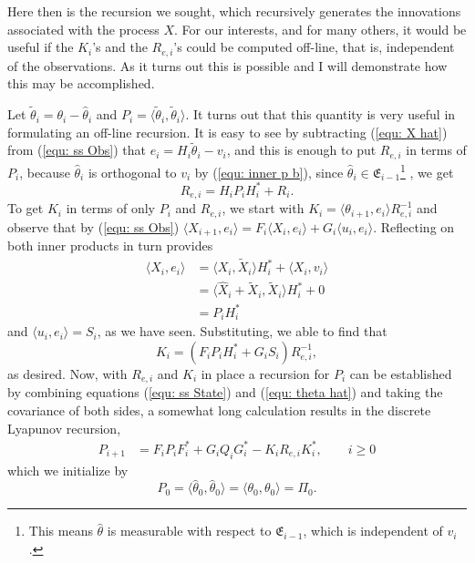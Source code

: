 \documentclass[12pt]{amsart}
\begin{document}
Here then is the recursion we sought, which recursively generates the innovations associated with the process $X$. For our interests, and for many others, it would be useful if the $K_i$'s and the $R_{e,i}$'s could be computed off-line, that is, independent of the observations. As it turns out this is possible and I will demonstrate how this may be accomplished.

Let $\tilde{\theta}_i = \theta_i - \hat{\theta}_{i}$ and $P_{i} = \langle \tilde{\theta}_{i},\tilde{\theta}_{i} \rangle$. It turns out that this quantity is very useful in formulating an off-line recursion. It is easy to see by subtracting (\ref{equ: X hat}) from (\ref{equ: ss Obs}) that $e_i = H_i\tilde{\theta}_{i} - v_i$, and this is enough to put $R_{e,i}$ in terms of $P_i$,
because $\hat{\theta}_{i}$ is orthogonal to $v_i$ by (\ref{equ: inner p b}), since $\hat{\theta}_{i}\in \mathfrak{E}_{i-1}$\footnote{
	This means $\hat{\theta}$ is measurable with respect to $\mathfrak{E}_{i-1}$, which is independent of $v_i$.}
, we get
$$R_{e,i} = H_iP_iH^*_i + R_i.$$
To get $K_i$ in terms of only $P_i$ and $R_{e,i}$, we start with $K_i = \langle \theta_{i+1}, e_i \rangle R_{e,i}^{-1}$ and observe that by (\ref{equ: ss Obs}) $\langle X_{i+1}, e_i \rangle = F_i\langle X_{i}, e_i \rangle  + G_i\langle u_i, e_i \rangle$. Reflecting on both inner products in turn provides
\begin{align*}
\langle X_{i}, e_i \rangle &= \langle X_{i}, \tilde{X}_i \rangle H^*_i + \langle X_{i}, v_i \rangle \\
&= \langle \hat{X}_{i} + \tilde{X}_i, \tilde{X}_i \rangle H^*_i + 0 \\
&= P_i H^*_i
\end{align*}
and $\langle u_{i}, e_i \rangle = S_i$, as we have seen. Substituting, we able to find that
$$K_i = (F_iP_iH_i^* + G_iS_i) R_{e,i}^{-1},$$
as desired.
Now, with $R_{e,i}$ and $K_i$ in place a recursion for $P_i$ can be established by
combining equations (\ref{equ: ss State}) and (\ref{equ: theta hat}) and taking the covariance of both sides, a somewhat long calculation results in the discrete Lyapunov recursion,
\begin{align}
\label{equ: DL} P_{i+1} &= F_iP_{i}F_i^* + G_iQ_iG_i^* - K_iR_{e,i}K^*_i,\qquad i\ge 0
\end{align}
which we initialize by $$P_{0} = \langle \hat{\theta}_{0}, \hat{\theta}_{0} \rangle = \langle \theta_0, \theta_0 \rangle = \Pi_0.$$ 
\end{document}
